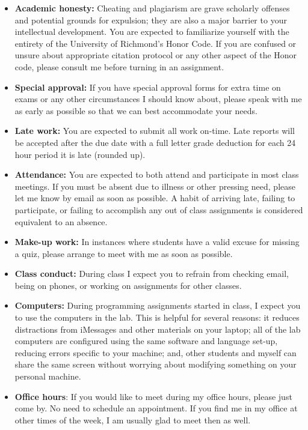\documentclass[12pt]{article}
\begin{document}
\begin{itemize}\setlength\itemsep{0em}
\item \textbf{Academic honesty:} Cheating and plagiarism are grave scholarly
offenses and potential grounds
for expulsion; they are also a major barrier to your intellectual development.
You are expected to familiarize yourself with the entirety of the
University of Richmond’s Honor Code. If you are confused or unsure about
appropriate citation protocol or any other aspect of the Honor code,
please consult me before turning in an assignment.
\item \textbf{Special approval:} If you have special approval forms for extra
time on exams or any other circumstances I should know about, please speak
with me as early as possible so that we can best accommodate your needs.
\item \textbf{Late work:} You are expected to submit all work on-time. Late reports
will be accepted after the due date with a full letter grade deduction for each
24 hour period it is late (rounded up).
\item \textbf{Attendance:} You are expected to both attend and participate in most
class meetings. If you must be absent due to illness or other pressing
need, please let me know by email as soon as possible. A habit of arriving
late, failing to participate, or failing to accomplish any out of class assignments
is considered equivalent to an absence.
\item \textbf{Make-up work:} In instances where students have a valid excuse for
missing a quiz, please arrange to meet with me as soon as possible.
\item \textbf{Class conduct:} During class I expect you to refrain from checking
email, being on phones, or working on assignments for other classes.
\item \textbf{Computers:} During programming assignments started in class, I expect you
to use the computers in the lab. This is helpful for several reasons: it
reduces distractions from iMessages and other materials on your laptop;
all of the lab computers are configured using the same software and language
set-up, reducing errors specific to your machine; and, other students and
myself can share the same screen without worrying about modifying something
on your personal machine.
\item \textbf{Office hours}: If you would like to meet during my office hours,
please just come by. No need to schedule an appointment. If you find me in
my office at other times of the week, I am usually glad to meet then as well.

\end{itemize}
\end{document}
